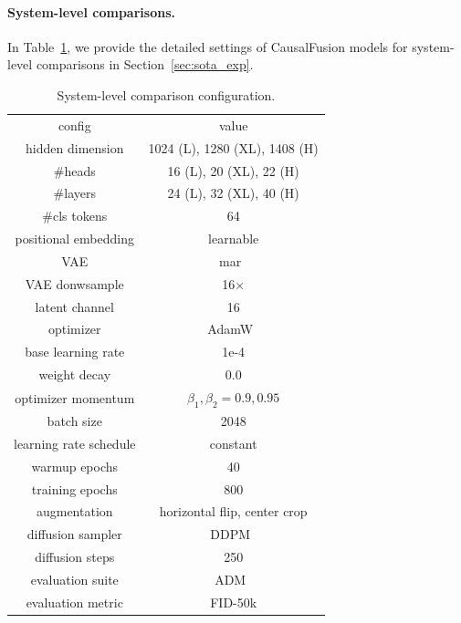 \vspace{-15pt}
\paragraph{System-level comparisons.}
In Table~\ref{tab:impl_sys}, we provide the detailed settings of CausalFusion models for system-level comparisons in Section~\ref{sec:sota_exp}.
\vspace{-5pt}

\begin{table}[h]
    \footnotesize
    \begin{tabular}{c|c}
        config & value \\
        \shline
        hidden dimension & 1024 (L), 1280 (XL), 1408 (H) \\
        \#heads & 16 (L), 20 (XL), 22 (H)  \\
        \#layers & 24 (L), 32 (XL), 40 (H) \\
        \#cls tokens & 64 \\
        positional embedding & learnable \\
        VAE & mar~\cite{mar} \\
        VAE donwsample& 16$\times$ \\
        latent channel & 16 \\
        \hline
        optimizer & AdamW~\cite{loshchilov2017decoupled} \\
        base learning rate & 1e-4 \\
        weight decay & 0.0 \\
        optimizer momentum & $\beta_1, \beta_2{=}0.9, 0.95$ \\
        batch size & 2048 \\
        learning rate schedule & constant \\
        warmup epochs & 40 \\
        training epochs & 800 \\
        augmentation & horizontal flip, center crop \\
        \hline
        diffusion sampler & DDPM~\cite{ddpm} \\
        diffusion steps & 250 \\
        evaluation suite & ADM~\cite{adm} \\
        evaluation metric & FID-50k
    \end{tabular}
    \caption{{System-level comparison} configuration.}
    \label{tab:impl_sys}
\end{table}


